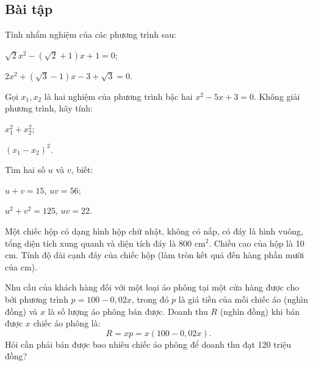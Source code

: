 \begin{exercises}
    \subsection{Bài tập}

    \begin{questions}[resume=SGK]
        \item Tính nhẩm nghiệm của các phương trình sau:
        \begin{questions}
            \item $\sqrt{2}x^2-(\sqrt{2}+1)x+1=0$;
            \item $2x^2+(\sqrt{3}-1)x-3+\sqrt{3}=0$.
        \end{questions}

        \answerline
        \answerline

        \item Gọi $x_1,x_2$ là hai nghiệm của phương trình bậc hai $x^2-5x+3=0$. Không giải phương trình, hãy tính:
        \begin{questions}
            \item $x_1^2+x_2^2$;
            \item $(x_1-x_2)^2$.
        \end{questions}

        \answerline
        \answerline
        \answerline

        \item Tìm hai số $u$ và $v$, biết:
        \begin{questions}
            \item $u+v=15$, $uv=56$;
            \item $u^2+v^2=125$, $uv=22$.
        \end{questions}

        \answerline
        \answerline
        \answerline

        \item Một chiếc hộp có dạng hình hộp chữ nhật, không có nắp, có đáy là hình vuông, tổng diện tích xung quanh và diện tích đáy là 800 cm$^2$. Chiều cao của hộp là 10 cm. Tính độ dài cạnh đáy của chiếc hộp (làm tròn kết quả đến hàng phần mười của cm).

        \answerline
        \answerline
        \answerline

        \item Nhu cầu của khách hàng đối với một loại áo phông tại một cửa hàng được cho bởi phương trình $p=100-0{,}02x$, trong đó $p$ là giá tiền của mỗi chiếc áo (nghìn đồng) và $x$ là số lượng áo phông bán được. Doanh thu $R$ (nghìn đồng) khi bán được $x$ chiếc áo phông là:
        \[
            R=xp=x(100-0{,}02x).
        \]
        Hỏi cần phải bán được bao nhiêu chiếc áo phông để doanh thu đạt 120 triệu đồng?

        \answerline
        \answerline
        \answerline
    \end{questions}
\end{exercises}
